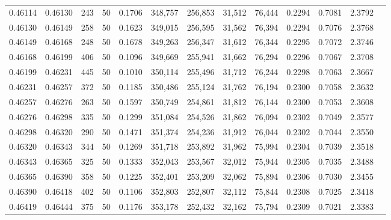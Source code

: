 \begin{tabular}{rrrrrrrrrrrrr}
0.46114 & 0.46130 &   243 &  50 &                                     0.1706 & 348,757 & 256,853 &  31,512 &  76,444 & 0.2294 & 0.7081 & 2.3792 \\
0.46130 & 0.46149 &   258 &  50 &                                     0.1623 & 349,015 & 256,595 &  31,562 &  76,394 & 0.2294 & 0.7076 & 2.3768 \\
0.46149 & 0.46168 &   248 &  50 &                                     0.1678 & 349,263 & 256,347 &  31,612 &  76,344 & 0.2295 & 0.7072 & 2.3746 \\
0.46168 & 0.46199 &   406 &  50 &                                     0.1096 & 349,669 & 255,941 &  31,662 &  76,294 & 0.2296 & 0.7067 & 2.3708 \\
0.46199 & 0.46231 &   445 &  50 &                                     0.1010 & 350,114 & 255,496 &  31,712 &  76,244 & 0.2298 & 0.7063 & 2.3667 \\
0.46231 & 0.46257 &   372 &  50 &                                     0.1185 & 350,486 & 255,124 &  31,762 &  76,194 & 0.2300 & 0.7058 & 2.3632 \\
0.46257 & 0.46276 &   263 &  50 &                                     0.1597 & 350,749 & 254,861 &  31,812 &  76,144 & 0.2300 & 0.7053 & 2.3608 \\
0.46276 & 0.46298 &   335 &  50 &                                     0.1299 & 351,084 & 254,526 &  31,862 &  76,094 & 0.2302 & 0.7049 & 2.3577 \\
0.46298 & 0.46320 &   290 &  50 &                                     0.1471 & 351,374 & 254,236 &  31,912 &  76,044 & 0.2302 & 0.7044 & 2.3550 \\
0.46320 & 0.46343 &   344 &  50 &                                     0.1269 & 351,718 & 253,892 &  31,962 &  75,994 & 0.2304 & 0.7039 & 2.3518 \\
0.46343 & 0.46365 &   325 &  50 &                                     0.1333 & 352,043 & 253,567 &  32,012 &  75,944 & 0.2305 & 0.7035 & 2.3488 \\
0.46365 & 0.46390 &   358 &  50 &                                     0.1225 & 352,401 & 253,209 &  32,062 &  75,894 & 0.2306 & 0.7030 & 2.3455 \\
0.46390 & 0.46418 &   402 &  50 &                                     0.1106 & 352,803 & 252,807 &  32,112 &  75,844 & 0.2308 & 0.7025 & 2.3418 \\
0.46419 & 0.46444 &   375 &  50 &                                     0.1176 & 353,178 & 252,432 &  32,162 &  75,794 & 0.2309 & 0.7021 & 2.3383 \\

\end{tabular}
